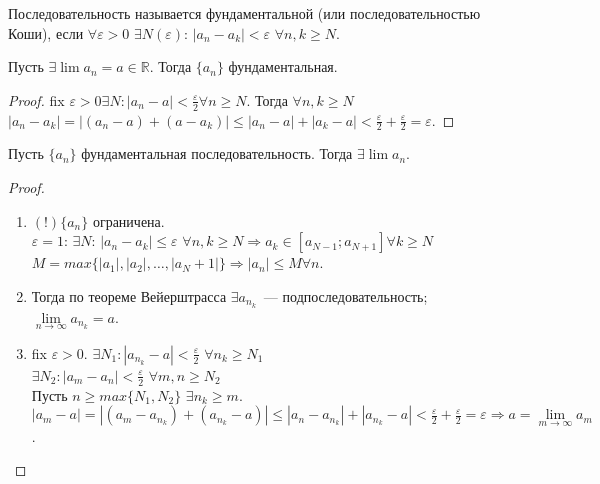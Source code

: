 \documentclass[12pt]{article}
\begin{document}
	\begin{definition}
		Последовательность называется фундаментальной (или последовательностью Коши), если $\forall \varepsilon > 0$ $\exists N(\varepsilon)$: $|a_n - a_k| < \varepsilon$ $\forall n, k \geqslant N$.
	\end{definition}
	\begin{statement}
		Пусть $\exists \lim a_n = a \in \mathbb{R}$. Тогда $\{a_n\}$ фундаментальная.
	\end{statement}
	\begin{proof}
		fix $\varepsilon > 0 \exists N: |a_n - a| < \frac{\varepsilon}{2} \forall n \geqslant N$. Тогда $\forall n, k \geqslant N$ $|a_n - a_k| = |(a_n - a) + (a - a_k)| \leqslant |a_n - a| + |a_k - a| < \frac{\varepsilon}{2} + \frac{\varepsilon}{2} = \varepsilon$.
	\end{proof}
	\begin{theorem}[Коши]
		Пусть $\{a_n\}$ фундаментальная последовательность. Тогда $\exists \lim a_n$.
	\end{theorem}
	\begin{proof}
		\begin{enumerate}[1)]
			\item $(!) \{a_n\}$ ограничена. \\
			$\varepsilon = 1$: $\exists N$: $|a_n - a_k| \leqslant \varepsilon$ $\forall n, k \geqslant N \Rightarrow a_k \in [a_{N - 1}; a_{N + 1}] \forall k \geqslant N$ \\
			$M = max\{|a_1|, |a_2|, \dots, |a_N + 1|\} \Rightarrow |a_n| \leqslant M \forall n$.
			\item Тогда по теореме Вейерштрасса $\exists a_{n_k}$~--- подпоследовательность; $\lim \limits_{n \rightarrow \infty} a_{n_k} = a$.
			\item fix $\varepsilon > 0$. $\exists N_1: |a_{n_k} - a| < \frac{\varepsilon}{2}$ $\forall n_k \geqslant N_1$ \\
			$\exists N_2: |a_m - a_n| < \frac{\varepsilon}{2}$ $\forall m, n \geqslant N_2$ \\
			Пусть $n \geqslant max\{N_1, N_2\}$ $\exists n_k \geqslant m$. \\
			$|a_m - a| = |(a_m - a_{n_k}) + (a_{n_k} - a)| \leqslant |a_n - a_{n_k}| + |a_{n_k} - a| < \frac{\varepsilon}{2} + \frac{\varepsilon}{2} = \varepsilon \Rightarrow a = \lim \limits_{m \rightarrow \infty} a_m$.
		\end{enumerate}
	\end{proof}
\end{document}
